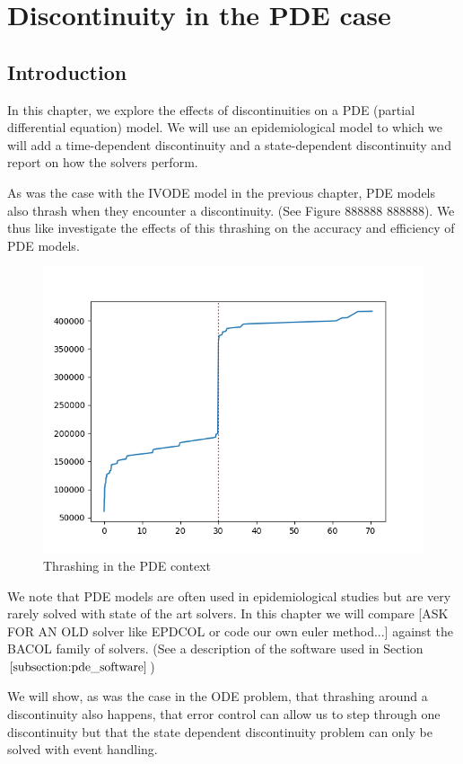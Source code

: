\documentclass{article}
\begin{document}
\section{Discontinuity in the PDE case}
\subsection{Introduction}
\label{subsection:pde_intro}
In this chapter, we explore the effects of discontinuities on a PDE (partial differential equation) model. We will use an epidemiological model to which we will add a time-dependent discontinuity and a state-dependent discontinuity and report on how the solvers perform.

As was the case with the IVODE model in the previous chapter, PDE models also thrash when they encounter a discontinuity. (See Figure 888888 888888). We thus like investigate the effects of this thrashing on the accuracy and efficiency of PDE models.

\begin{figure}[H]
\centering
\includegraphics[width=0.7\linewidth]{./figures/PDE_thrashing}
\caption{Thrashing in the PDE context}
\label{fig:thrashing_pde}
\end{figure}

We note that PDE models are often used in epidemiological studies but are very rarely solved with state of the art solvers. In this chapter we will compare [ASK FOR AN OLD solver like EPDCOL or code our own euler method...] against the BACOL family of solvers. (See a description of the software used in Section $\ref{subsection:pde_software}$)

We will show, as was the case in the ODE problem, that thrashing around a discontinuity also happens, that error control can allow us to step through one discontinuity but that the state dependent discontinuity problem can only be solved with event handling. 
\end{document}
